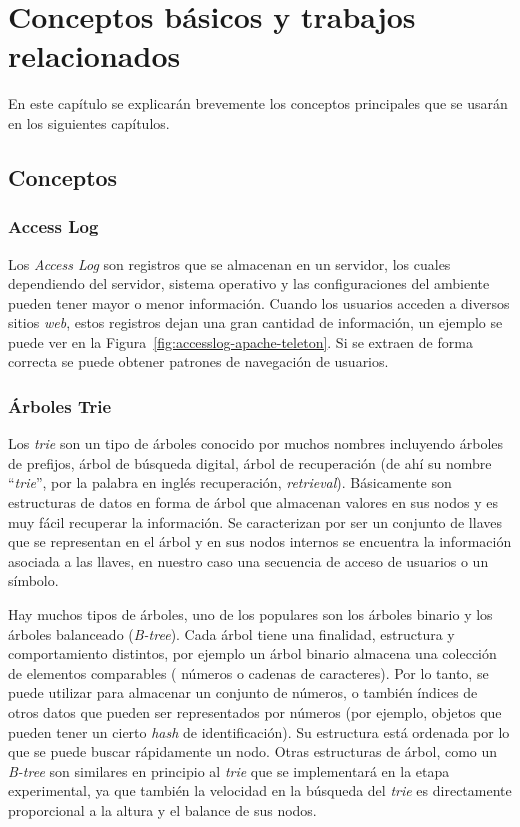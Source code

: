\chapter[Conceptos Básicos]{Conceptos básicos y trabajos relacionados} \label{ch:Conceptos-Basicos}





En este capítulo se explicarán brevemente los conceptos principales que se usarán en los siguientes capítulos.


\section{Conceptos}

\subsection{Access Log}\label{concept-accesslog}

Los \emph{Access Log} son registros que se almacenan en un servidor, los cuales dependiendo del servidor, sistema operativo y las configuraciones del ambiente pueden tener mayor o menor información. Cuando los usuarios acceden a diversos sitios \emph{web}, estos registros dejan una gran cantidad de información, un ejemplo se puede ver en la Figura~\ref{fig:accesslog-apache-teleton}. Si se extraen de forma correcta se puede obtener patrones de navegación de usuarios. 


\subsection{Árboles Trie} \label{concept-trie}

Los \emph{trie} son un tipo de árboles conocido por muchos nombres incluyendo árboles de prefijos, árbol de búsqueda digital, árbol de recuperación (de ahí su nombre ``\emph{trie}'', por la palabra en inglés recuperación, \emph{retrieval}). Básicamente son estructuras de datos en forma de árbol que almacenan valores en sus nodos y es muy fácil recuperar la información. Se caracterizan por ser un conjunto de llaves que se representan en el árbol y en sus nodos internos se encuentra la información asociada a las llaves, en nuestro caso una secuencia de acceso de usuarios o un símbolo. 

Hay muchos tipos de árboles, uno de los populares son los árboles binario y los árboles balanceado (\emph{B-tree}). Cada árbol tiene una finalidad, estructura y comportamiento distintos, por ejemplo un árbol binario almacena una colección de elementos comparables ( números o cadenas de caracteres). Por lo tanto, se puede utilizar para almacenar un conjunto de números, o también  índices de otros datos que pueden ser representados por números (por ejemplo, objetos que pueden tener un cierto \emph{hash} de identificación). Su estructura está ordenada por lo que se puede buscar rápidamente un nodo. Otras estructuras de árbol, como un \emph{B-tree} son similares en principio al \emph{trie} que se implementará en la etapa experimental, ya que también la velocidad en la búsqueda del \emph{trie} es directamente proporcional a la altura y el balance de sus nodos.


